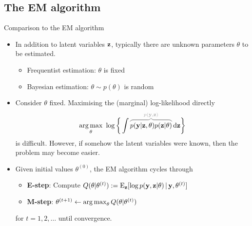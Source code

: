 \subsection{The EM algorithm}
\begin{frame}[label=emalg]{Comparison to the EM algorithm }
  \begin{itemize}
    \setlength\itemsep{0.5em}
    \item In addition to latent variables ${\mathbf z}$, typically there are unknown parameters $\theta$ to be estimated.
    \begin{itemize}
      \item Frequentist estimation: $\theta$ is fixed
      \item Bayesian estimation: $\theta \sim p(\theta)$ is random
    \end{itemize}
    \item Consider $\theta$ fixed. Maximising the (marginal) log-likelihood directly
      \begin{align*}
        \argmax_\theta \ \log \bigg\{\int \myoverbrace{p(\by|\bz,\theta)p(\bz|\theta)}{p(\by,\bz)} \d\bz \bigg\}
      \end{align*}
    is difficult. However, if somehow the latent variables were known, then the problem may become easier.
    \item Given initial values $\theta^{(0)}$, the EM algorithm cycles through\vspace{0.2em}
        \begin{itemize}\setlength\itemsep{0.2em}
          \item \textbf{E-step}: Compute $Q(\theta|\theta^{(t)}) := \operatorname{E}_{\mathbf z}[\log p({\mathbf y},{\mathbf z}|\theta) \,|\, {\mathbf y},\theta^{(t)}] $ \vspace{0.3em}
          \item \textbf{M-step}: $\theta^{(t+1)} \gets \operatorname*{arg\,max}_\theta Q(\theta|\theta^{(t)})$
        \end{itemize}
        for $t=1,2,\dots$ until convergence.
  \end{itemize}

\end{frame}

